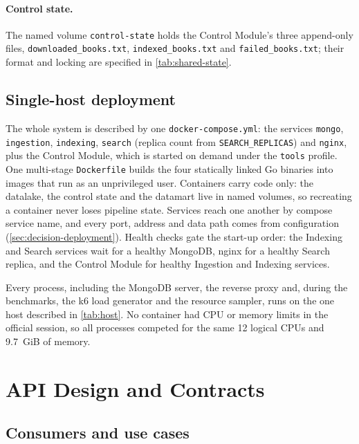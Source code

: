 \documentclass[10pt,a4paper]{article}
\newcommand{\code}[1]{\texttt{#1}}
\begin{document}
\paragraph{Control state.}
The named volume \code{control-state} holds the Control Module's three
append-only files, \code{downloaded\_books.txt}, \code{indexed\_books.txt} and
\code{failed\_books.txt}; their format and locking are specified in
\cref{tab:shared-state}.

\subsection{Single-host deployment}
\label{sec:deployment}

The whole system is described by one \code{docker-compose.yml}: the services
\code{mongo}, \code{ingestion}, \code{indexing}, \code{search} (replica count
from \code{SEARCH\_REPLICAS}) and \code{nginx}, plus the Control Module, which
is started on demand under the \code{tools} profile. One multi-stage
\code{Dockerfile} builds the four statically linked Go binaries into images
that run as an unprivileged user. Containers carry code only: the datalake,
the control state and the datamart live in named volumes, so recreating a
container never loses pipeline state. Services reach one another by compose
service name, and every port, address and data path comes from configuration
(\cref{sec:decision-deployment}). Health checks gate the start-up order: the
Indexing and Search services wait for a healthy MongoDB, nginx for a healthy
Search replica, and the Control Module for healthy Ingestion and Indexing
services.

Every process, including the MongoDB server, the reverse proxy and, during
the benchmarks, the k6 load generator and the resource sampler, runs on the
one host described in \cref{tab:host}. No container had CPU or memory limits in
the official session, so all processes competed for the same 12 logical CPUs
and 9.7~GiB of memory.
\section{API Design and Contracts}
\label{sec:api}

\subsection{Consumers and use cases}
\label{sec:use-cases}
\end{document}
